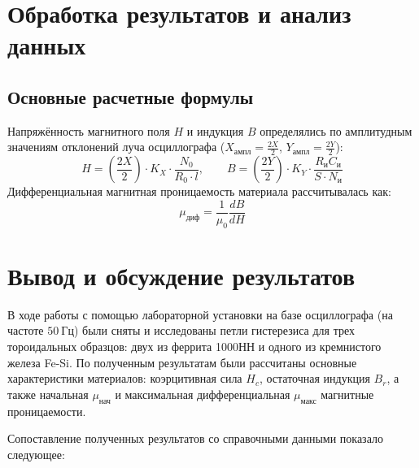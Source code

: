 \documentclass[12pt, letterpaper]{article}
\begin{document}
\section*{Обработка результатов и анализ данных}

\subsection*{Основные расчетные формулы}
Напряжённость магнитного поля $H$ и индукция $B$ определялись по амплитудным значениям отклонений луча осциллографа ($X_{\text{ампл}} = \frac{2X}{2}$, $Y_{\text{ампл}} = \frac{2Y}{2}$):
\begin{equation}
H = \left(\frac{2X}{2}\right) \cdot K_X \cdot \frac{N_0}{R_0 \cdot l}, \qquad B = \left(\frac{2Y}{2}\right) \cdot K_Y \cdot \frac{R_и C_и}{S \cdot N_и}
\end{equation}
Дифференциальная магнитная проницаемость материала рассчитывалась как:
\begin{equation}
\mu_{\text{диф}} = \frac{1}{\mu_0} \frac{dB}{dH}
\end{equation}

\section*{Вывод и обсуждение результатов}

В ходе работы с помощью лабораторной установки на базе осциллографа (на частоте $50~\text{Гц}$) были сняты и исследованы петли гистерезиса для трех тороидальных образцов: двух из феррита 1000НН и одного из кремнистого железа Fe-Si. По полученным результатам были рассчитаны основные характеристики материалов: коэрцитивная сила $H_c$, остаточная индукция $B_r$, а также начальная $\mu_{\text{нач}}$ и максимальная дифференциальная $\mu_{\text{макс}}$ магнитные проницаемости.

Сопоставление полученных результатов со справочными данными показало следующее:
\end{document}
